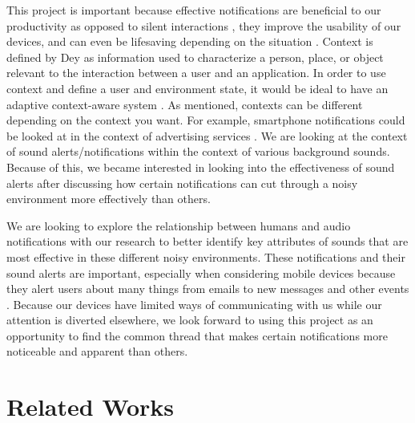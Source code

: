 \documentclass[manuscript,screen,review]{acmart}
\begin{document}
This project is important because effective notifications are beneficial to our productivity as opposed to silent interactions \cite{10.1145/2785830.2785852}, they improve the usability of our devices, and can even be lifesaving depending on the situation \cite{doi:10.1161/CIRCULATIONAHA.119.044126}. Context is defined by Dey \cite{dey2001understanding} as information used to characterize a person, place, or object relevant to the interaction between a user and an application. In order to use context and define a user and environment state, it would be ideal to have an adaptive context-aware system \cite{3274192.3274203}. As mentioned, contexts can be different depending on the context you want. For example, smartphone notifications could be looked at in the context of advertising services \cite{2851581.2892383}. We are looking at the context of sound alerts/notifications within the context of various background sounds. Because of this, we became interested in looking into the effectiveness of sound alerts after discussing how certain notifications can cut through a noisy environment more effectively than others.

We are looking to explore the relationship between humans and audio notifications with our research to better identify key attributes of sounds that are most effective in these different noisy environments. These notifications and their sound alerts are important, especially when considering mobile devices \cite{2493190.2493225} because they alert users about many things from emails to new messages and other events \cite{2628363.2628364, 2556288.2557189}. Because our devices have limited ways of communicating with us while our attention is diverted elsewhere, we look forward to using this project as an opportunity to find the common thread that makes certain notifications more noticeable and apparent than others.


\section{Related Works}
\end{document}

